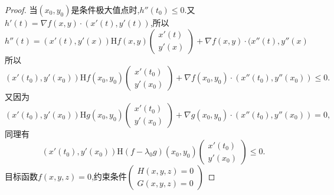 \documentclass[UTF8]{ctexart}
\begin{document}
\begin{proof}
        当$(x_0,y_0)$是条件极大值点时,$h''(t_0)\le 0.$又$h'(t)=\nabla f(x,y)\cdot(x'(t),y'(t))$,所以$h''(t)=(x'(t),y'(x))\mathrm{H}f(x,y)\begin{pmatrix}
            x'(t)\\
            y'(x)
        \end{pmatrix}+\nabla f(x,y)\cdot(x''(t),y''(x)$
        所以$$(x'(t_0),y'(x_0))\mathrm{H}f(x_0,y_0)\begin{pmatrix}
            x'(t_0)\\
            y'(x_0)
        \end{pmatrix}+\nabla f(x_0,y_0)\cdot(x''(t_0),y''(x_0))\le 0.$$
        又因为$$(x'(t_0),y'(x_0))\mathrm{H}g(x_0,y_0)\begin{pmatrix}
            x'(t_0)\\
            y'(x_0)
        \end{pmatrix}+\nabla g(x_0,y_0)\cdot(x''(t_0),y''(x_0))=0,$$
        同理有$$(x'(t_0),y'(x_0))\mathrm{H}(f-\lambda_0g)(x_0,y_0)\begin{pmatrix}
            x'(t_0)\\
            y'(x_0)
        \end{pmatrix}\le 0.$$
        目标函数$f(x,y,z)=0$,约束条件$\begin{pmatrix}
            H(x,y,z)=0\\
            G(x,y,z)=0
        \end{pmatrix}$
    \end{proof}
\end{document}
